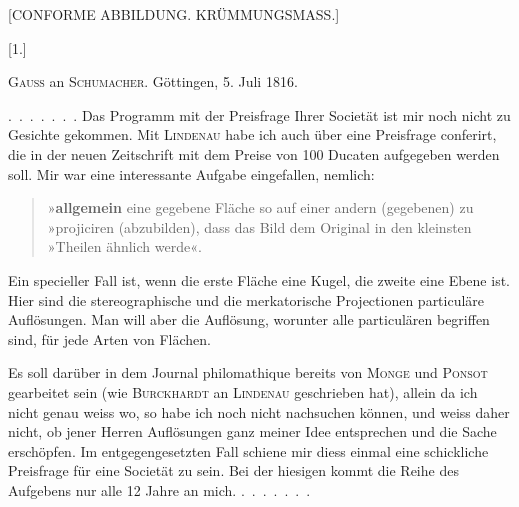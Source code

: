 \clearpage
{}%
\begin{center}\large [CONFORME ABBILDUNG. KRÜMMUNGSMASS.]\end{center}
\begin{center}[1.]\end{center}
\begin{center}\textsc{Gauss} an \textsc{Schumacher}. Göttingen, 5. Juli 1816.\end{center}

\mbox{. . . . . . .} Das Programm mit der Preisfrage Ihrer Societät ist mir noch nicht zu Gesichte gekommen. Mit \textsc{Lindenau} habe ich auch über eine Preisfrage conferirt, die in der neuen Zeitschrift mit dem Preise von 100 Ducaten aufgegeben werden soll. Mir war eine interessante Aufgabe eingefallen, nemlich:
\begin{quote}
\noindent »\textbf{allgemein} eine gegebene Fläche so auf einer andern (gegebenen) zu\\
»projiciren (abzubilden), dass das Bild dem Original in den kleinsten\\
»Theilen ähnlich werde«.
\end{quote}

Ein specieller Fall ist, wenn die erste Fläche eine Kugel, die zweite eine Ebene ist. Hier sind die stereographische und die merkatorische Projectionen particuläre Auflösungen. Man will aber die  Auflösung, worunter alle particulären begriffen sind, für jede Arten von Flächen.

Es soll darüber in dem Journal philomathique bereits von \textsc{Monge} und \textsc{Ponsot} gearbeitet sein (wie \textsc{Burckhardt} an \textsc{Lindenau} geschrieben hat), allein da ich nicht genau weiss wo, so habe ich noch nicht nachsuchen können, und weiss daher nicht, ob jener Herren Auflösungen ganz meiner Idee entsprechen und die Sache erschöpfen. Im entgegengesetzten Fall schiene mir diess einmal eine schickliche Preisfrage für eine Societät zu sein. Bei der hiesigen kommt die Reihe des Aufgebens nur alle 12 Jahre an mich. \mbox{. . . . . . .}
